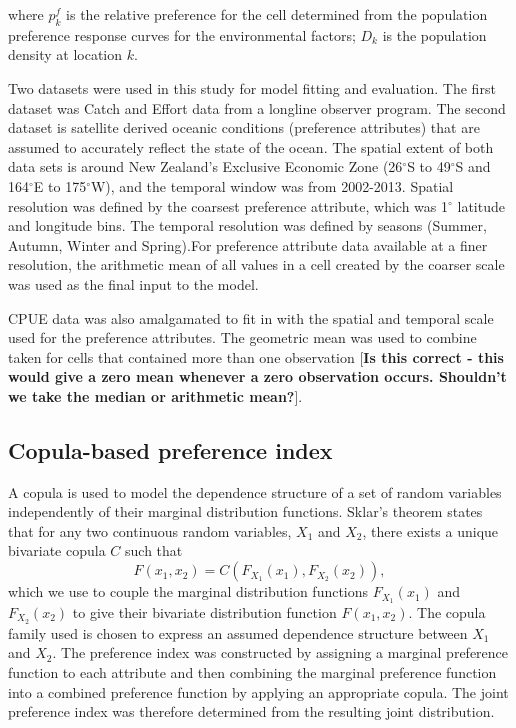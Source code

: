 \documentclass[review]{elsarticle}
\begin{document}
where $p^f_k$ is the relative preference for the cell determined from the population preference response curves for the environmental factors;  $D_k$ is the population density at location $k$.  


Two datasets were used in this study for model fitting and evaluation. The first dataset was Catch and Effort data from a longline observer program. The second dataset is satellite derived oceanic conditions (preference attributes) that are assumed to accurately reflect the state of the ocean. The spatial extent of both data sets is around New Zealand's Exclusive Economic Zone (26$^\circ$S to 49$^\circ$S and 164$^\circ$E to 175$^\circ$W), and the temporal window was from 2002-2013. Spatial resolution was defined by the coarsest preference attribute, which was 1$^\circ$ latitude and longitude bins. The temporal resolution was defined by seasons (Summer, Autumn, Winter and Spring).For preference attribute data available at a finer resolution, the arithmetic mean of all values in a cell created by the coarser scale was used as the final input to the model.

CPUE data was also amalgamated to fit in with the spatial and temporal scale used for the preference attributes. The geometric mean was used to combine taken for cells that contained more than one observation [{\bf Is this correct - this would give a zero mean whenever a zero observation occurs. Shouldn't we take the median or arithmetic mean?}]. 

\subsection{Copula-based preference index}

A copula is used to model the dependence structure of a set of random variables independently of their marginal distribution functions. Sklar's theorem states that for any two continuous random variables, $X_1$ and $X_2$, there exists a unique bivariate copula $C$ such that 
$$F(x_1,x_2) = C(F_{X_1}(x_1), F_{X_2}(x_2)),$$  which we use to couple the marginal distribution functions $F_{X_1}(x_1)$ and $F_{X_2}(x_2)$ to give their bivariate distribution function $F(x_1,x_2)$.  The copula family used is chosen to express an assumed dependence structure between $X_1$ and $X_2$.
The preference index was constructed by assigning a marginal preference function to each attribute and then combining the marginal preference function into a combined preference function by applying an appropriate copula.  The joint preference index was therefore determined from the resulting joint distribution.
\end{document}
